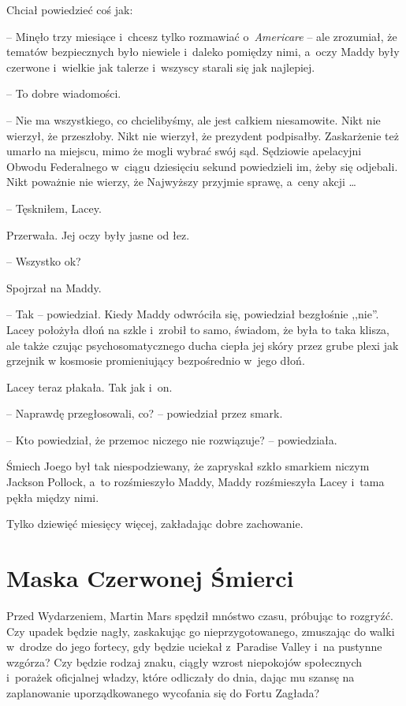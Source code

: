 \documentclass[oneside,polish,11pt,sfheadings]{mwbk}
\begin{document}
Chciał powiedzieć coś jak: 

-- Minęło trzy miesiące i~chcesz tylko
rozmawiać o~\textit{Americare} -- ale zrozumiał, że tematów bezpiecznych
było niewiele i~daleko pomiędzy nimi, a~oczy Maddy były czerwone i~wielkie jak talerze i~wszyscy starali się jak najlepiej.

-- To dobre wiadomości.

-- Nie ma wszystkiego, co chcielibyśmy, ale jest całkiem niesamowite.
Nikt nie wierzył, że przeszłoby. Nikt nie wierzył, że prezydent
podpisałby. Zaskarżenie też umarło na miejscu, mimo że mogli wybrać swój
sąd. Sędziowie apelacyjni Obwodu Federalnego w~ciągu dziesięciu sekund
powiedzieli im, żeby się odjebali. Nikt poważnie nie wierzy, że
Najwyższy przyjmie sprawę, a~ceny akcji \ldots 

-- Tęskniłem, Lacey.

Przerwała. Jej oczy były jasne od łez.

-- Wszystko ok?

Spojrzał na Maddy. 

-- Tak -- powiedział. Kiedy Maddy odwróciła się,
powiedział bezgłośnie ,,nie''. Lacey położyła dłoń na szkle i~zrobił to
samo, świadom, że była to taka klisza, ale także czując
psychosomatycznego ducha ciepła jej skóry przez grube plexi jak grzejnik
w kosmosie promieniujący bezpośrednio w~jego dłoń.

Lacey teraz płakała. Tak jak i~on.

-- Naprawdę przegłosowali, co? -- powiedział przez smark.

-- Kto powiedział, że przemoc niczego nie rozwiązuje? -- powiedziała.

Śmiech Joego był tak niespodziewany, że zapryskał szkło smarkiem niczym
Jackson Pollock, a~to rozśmieszyło Maddy, Maddy rozśmieszyła Lacey i~tama pękła między nimi.

Tylko dziewięć miesięcy więcej, zakładając dobre zachowanie.

\chapter*{Maska Czerwonej Śmierci}

Przed Wydarzeniem, Martin Mars spędził mnóstwo czasu, próbując to
rozgryźć. Czy upadek będzie nagły, zaskakując go nieprzygotowanego,
zmuszając do walki w~drodze do jego fortecy, gdy będzie uciekał z~Paradise Valley i~na pustynne wzgórza? Czy będzie rodzaj znaku, ciągły
wzrost niepokojów społecznych i~porażek oficjalnej władzy, które
odliczały do dnia, dając mu szansę na zaplanowanie uporządkowanego
wycofania się do Fortu Zagłada?
\end{document}
